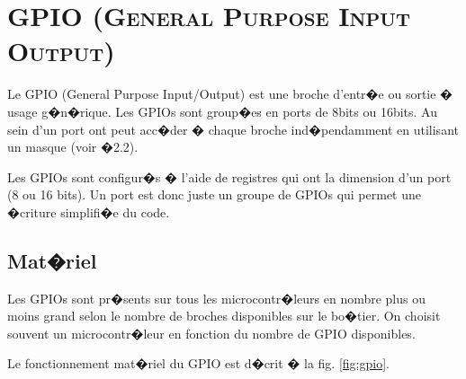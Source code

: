 \chapter{\textsc{GPIO (General Purpose Input Output)}}

Le GPIO (General Purpose Input/Output) est une broche d'entr�e ou sortie � usage g�n�rique. Les GPIOs sont group�es en ports de 8bits ou 16bits. Au sein d'un port ont peut acc�der � chaque broche ind�pendamment en utilisant un masque (voir �2.2).

Les GPIOs sont configur�s � l'aide de registres qui ont la dimension d'un port (8 ou 16 bits). Un port est donc juste un groupe de GPIOs qui permet une �criture simplifi�e du code.


\section{Mat�riel}

Les GPIOs sont pr�sents sur tous les microcontr�leurs en nombre plus ou moins grand selon le nombre de broches disponibles sur le bo�tier. On choisit souvent un microcontr�leur en fonction du nombre de GPIO disponibles.

Le fonctionnement mat�riel du GPIO est d�crit � la fig. \ref{fig:gpio}. 

